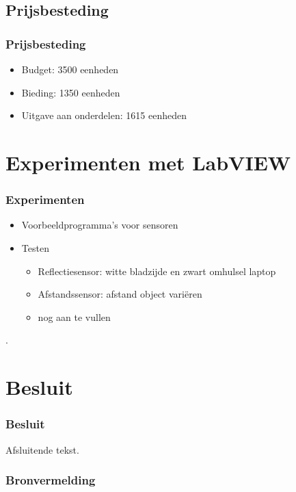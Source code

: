 \documentclass
   [kulak] %
   {kulakbeamer}
\begin{document}
\subsection{Prijsbesteding}
\begin{frame}
	\frametitle{Prijsbesteding}
	\begin{itemize}
		\item Budget: 3500 eenheden
		\item Bieding: 1350 eenheden
		\item Uitgave aan onderdelen: 1615 eenheden
	\end{itemize}
\end{frame}



\section[Experimenten]{Experimenten met LabVIEW}

\begin{frame}
	\frametitle{Experimenten}
	\begin{itemize}
		\item Voorbeeldprogramma's voor sensoren
		\item Testen
		\begin{itemize}
			\item Reflectiesensor: witte bladzijde en zwart omhulsel laptop
			\item Afstandssensor: afstand object variëren
			\item nog aan te vullen
		\end{itemize}
	\end{itemize}.
\end{frame}



\section{Besluit}
\begin{frame}
\frametitle{Besluit}
Afsluitende tekst.
\end{frame}

\begin{frame}
\frametitle{Bronvermelding}
	
	
	
\end{frame}
\end{document}
